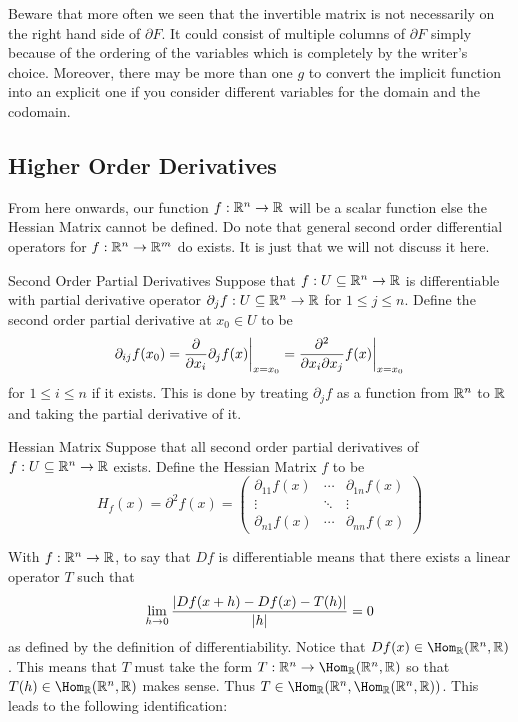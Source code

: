 \documentclass[a4paper]{article}
\begin{document}
Beware that more often we seen that the invertible matrix is not necessarily on the right hand side of $\partial F$. It could consist of multiple columns of $\partial F$ simply because of the ordering of the variables which is completely by the writer's choice. Moreover, there may be more than one $g$ to convert the implicit function into an explicit one if you consider different variables for the domain and the codomain. 

\subsection{Higher Order Derivatives}
From here onwards, our function $f:\mathbb{R}^n\to\mathbb{R}$ will be a scalar function else the Hessian Matrix cannot be defined. Do note that general second order differential operators for $f:\mathbb{R}^n\to\mathbb{R}^m$ do exists. It is just that we will not discuss it here. 

\begin{defn}{Second Order Partial Derivatives}{} Suppose that $f:U\subseteq\mathbb{R}^n\to\mathbb{R}$ is differentiable with partial derivative operator $\partial_jf:U\subseteq\mathbb{R}^n\to\mathbb{R}$ for $1\leq j\leq n$. Define the second order partial derivative at $x_0\in U$ to be $$\partial_{ij}f(x_0)=\frac{\partial}{\partial x_i}\partial_jf(x)\bigg{|}_{x=x_0}=\frac{\partial^2}{\partial x_i\partial x_j}f(x)\bigg{|}_{x=x_0}$$
for $1\leq i\leq n$ if it exists. This is done by treating $\partial_jf$ as a function from $\mathbb{R}^n$ to $\mathbb{R}$ and taking the partial derivative of it. 
\end{defn}

\begin{defn}{Hessian Matrix}{} Suppose that all second order partial derivatives of $f:U\subseteq\mathbb{R}^n\to\mathbb{R}$ exists. Define the Hessian Matrix $f$ to be $$H_f(x)=\partial^2 f(x)=\begin{pmatrix}
\partial_{11}f(x) & \cdots & \partial_{1n}f(x)\\
\vdots & \ddots & \vdots\\
\partial_{n1}f(x) & \cdots & \partial_{nn}f(x)
\end{pmatrix}$$
\end{defn}

With $f:\mathbb{R}^n\to\mathbb{R}$, to say that $Df$ is differentiable means that there exists a linear operator $T$ such that $$\lim_{h\to 0}\frac{\abs{Df(x+h)-Df(x)-T(h)}}{\abs{h}}=0$$ as defined by the definition of differentiability. Notice that $Df(x)\in\Hom_\R(\R^n,\R)$. This means that $T$ must take the form $T:\R^n\to\Hom_\R(\R^n,\R)$ so that $T(h)\in\Hom_\R(\R^n,\R)$ makes sense. Thus $T\in\Hom_\R(\R^n,\Hom_\R(\R^n,\R))$. This leads to the following identification: 
\end{document}
